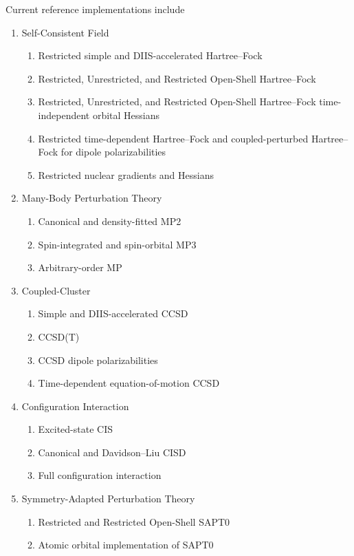 Current reference implementations include
\begin{enumerate}
\item Self-Consistent Field
   \begin{enumerate}
   \item Restricted simple and DIIS\cite{25}-accelerated Hartree--Fock
   \item Restricted, Unrestricted, and Restricted Open-Shell Hartree--Fock
   \item Restricted, Unrestricted, and Restricted Open-Shell Hartree--Fock time-independent orbital Hessians
   \item Restricted time-dependent Hartree--Fock and coupled-perturbed Hartree--Fock for dipole polarizabilities
   \item Restricted nuclear gradients and Hessians
   \end{enumerate}

\item Many-Body Perturbation Theory
    \begin{enumerate}
    \item Canonical and density-fitted MP2
    \item Spin-integrated and spin-orbital MP3
    \item Arbitrary-order MP
    \end{enumerate}

\item Coupled-Cluster
    \begin{enumerate}
    \item Simple and DIIS-accelerated CCSD
    \item CCSD(T)
    \item CCSD dipole polarizabilities
    \item Time-dependent equation-of-motion CCSD
    \end{enumerate}

\item Configuration Interaction
    \begin{enumerate}
    \item Excited-state CIS
    \item Canonical and Davidson--Liu CISD
    \item Full configuration interaction
    \end{enumerate}

\item Symmetry-Adapted Perturbation Theory
    \begin{enumerate}
    \item Restricted and Restricted Open-Shell SAPT0
    \item Atomic orbital implementation of SAPT0
    \end{enumerate}


\end{enumerate}
